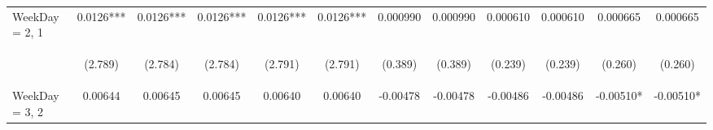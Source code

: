 \documentclass[]{article}
\begin{document}
\begin{center}
\begin{tabular}{lccccccccccc}
WeekDay = 2, 1 & 0.0126*** & 0.0126*** & 0.0126*** & 0.0126*** & 0.0126*** & 0.000990 & 0.000990 & 0.000610 & 0.000610 & 0.000665 & 0.000665 \\
\vspace{4pt} & \begin{footnotesize}(2.789)\end{footnotesize} & \begin{footnotesize}(2.784)\end{footnotesize} & \begin{footnotesize}(2.784)\end{footnotesize} & \begin{footnotesize}(2.791)\end{footnotesize} & \begin{footnotesize}(2.791)\end{footnotesize} & \begin{footnotesize}(0.389)\end{footnotesize} & \begin{footnotesize}(0.389)\end{footnotesize} & \begin{footnotesize}(0.239)\end{footnotesize} & \begin{footnotesize}(0.239)\end{footnotesize} & \begin{footnotesize}(0.260)\end{footnotesize} & \begin{footnotesize}(0.260)\end{footnotesize} \\
WeekDay = 3, 2 & 0.00644 & 0.00645 & 0.00645 & 0.00640 & 0.00640 & -0.00478 & -0.00478 & -0.00486 & -0.00486 & -0.00510* & -0.00510* \\

\end{tabular}
\end{center}
\end{document}
